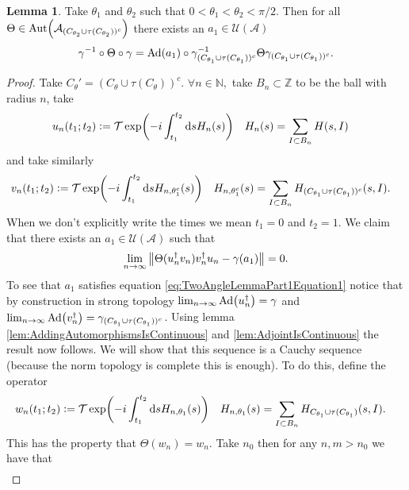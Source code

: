 \documentclass[12pt,a4paper,twoside]{article}
\renewcommand{\d}{\text{d}}
\newcommand{\defeq}{\vcentcolon=}
\let\originalleft\left
\let\originalright\right
\renewcommand{\left}{\mathopen{}\mathclose\bgroup\originalleft}
\renewcommand{\right}{\aftergroup\egroup\originalright}
\newcommand{\UU}{\mathcal U}
\newcommand{\ZZ}{\mathbb Z}
\renewcommand{\AA}{\mathcal A}
\newcommand{\NN}{\mathbb{N}}
\newcommand{\Ad}[1]{\textrm{Ad}\left(#1\right)}
\newcommand{\Aut}[1]{\textrm{Aut}\left(#1\right)}
\theoremstyle{definition}
\newtheorem{lemma}[theorem]{Lemma}
\numberwithin{equation}{section}
\begin{document}
\begin{lemma}\label{lem:TwoAngleLemmaPart1}
	Take $\theta_1$ and $\theta_2$ such that $0<\theta_1<\theta_2<\pi/2$. Then for all $\Theta\in\Aut{\AA_{(C_{\theta_2}\cup \tau(C_{\theta_2}))^c}}$ there exists an $a_1\in\UU(\AA)$
		\begin{equation}\label{eq:TwoAngleLemmaPart1Equation1}
			\gamma^{-1}\circ\Theta\circ\gamma=\Ad{a_1}\circ\gamma_{(C_{\theta_1}\cup \tau(C_{\theta_1}))^c}^{-1}\Theta\gamma_{(C_{\theta_1}\cup \tau(C_{\theta_1}))^c}.
		\end{equation}
\end{lemma}
\begin{proof}
	Take $C_\theta'=(C_\theta\cup\tau(C_\theta))^c.$ $\forall n\in\NN,$ take $B_n\subset\ZZ$ to be the ball with radius $n$, take
	\begin{align}
		u_n(t_1;t_2)&\defeq \mathcal{T}\exp(-i\int_{t_1}^{t_2} \d s H_n(s))&H_n(s)&=\sum_{I\subset B_n}H(s,I)
	\end{align}
	and take similarly
	\begin{align}
		v_n(t_1;t_2)&\defeq \mathcal{T}\exp(-i\int_{t_1}^{t_2} \d s H_{n,\theta_1^c}(s) )&H_{n,\theta_1^c}(s)&=\sum_{I\subset B_n}H_{(C_{\theta_1}\cup \tau(C_{\theta_1}))^c}(s,I).
	\end{align}
	When we don't explicitly write the times we mean $t_1=0$ and $t_2=1$. We claim that there exists an $a_1\in\UU(\AA)$ such that
	\begin{equation}
		\lim_{n\rightarrow\infty}\norm{\Theta(u_n^\dagger v_n)v_n^\dagger u_n-\gamma(a_1)}=0.
	\end{equation}
	To see that $a_1$ satisfies equation \eqref{eq:TwoAngleLemmaPart1Equation1} notice that by construction in strong topology $\lim_{n\rightarrow\infty}\Ad{u_n^\dagger}=\gamma$ and $\lim_{n\rightarrow\infty}\Ad{v_n^\dagger}=\gamma_{(C_{\theta_1}\cup \tau(C_{\theta_1}))^c}$. Using lemma \ref{lem:AddingAutomorphismsIsContinuous} and \ref{lem:AdjointIsContinuous} the result now follows. We will show that this sequence is a Cauchy sequence (because the norm topology is complete this is enough). To do this, define the operator
	\begin{align}
		w_n(t_1;t_2)&\defeq \mathcal{T}\exp(-i\int_{t_1}^{t_2} \d s H_{n,\theta_1}(s))&H_{n,\theta_1}(s)&=\sum_{I\subset B_n}H_{C_{\theta_1}\cup \tau(C_{\theta_1})}(s,I).
	\end{align}
	This has the property that $\Theta(w_n)=w_n$. Take $n_0$ then for any $n,m>n_0$ we have that
	\begin{align}

\end{align}
\end{proof}
\end{document}
